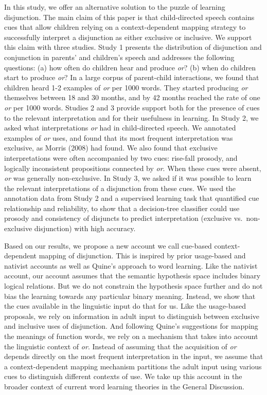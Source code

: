 \documentclass[
  ,man,floatsintext]{apa6}
\begin{document}
In this study, we offer an alternative solution to the puzzle of learning disjunction. The main claim of this paper is that child-directed speech contains cues that allow children relying on a context-dependent mapping strategy to successfully interpret a disjunction as either exclusive or inclusive. We support this claim with three studies. Study 1 presents the distribution of disjunction and conjunction in parents' and children's speech and addresses the following questions: (a) how often do children hear and produce \emph{or}? (b) when do children start to produce \emph{or}? In a large corpus of parent-child interactions, we found that children heard 1-2 examples of \emph{or} per 1000 words. They started producing \emph{or} themselves between 18 and 30 months, and by 42 months reached the rate of one \emph{or} per 1000 words. Studies 2 and 3 provide support both for the presence of cues to the relevant interpretation and for their usefulness in learning. In Study 2, we asked what interpretations \emph{or} had in child-directed speech. We annotated examples of \emph{or} uses, and found that its most frequent interpretation was exclusive, as Morris (2008) had found. We also found that exclusive interpretations were often accompanied by two cues: rise-fall prosody, and logically inconsistent propositions connected by \emph{or}. When these cues were absent, \emph{or} was generally non-exclusive. In Study 3, we asked if it was possible to learn the relevant interpretations of a disjunction from these cues. We used the annotation data from Study 2 and a supervised learning task that quantified cue relationship and reliability, to show that a decision-tree classifier could use prosody and consistency of disjuncts to predict interpretation (exclusive vs.~non-exclusive disjunction) with high accuracy.

Based on our results, we propose a new account we call cue-based context-dependent mapping of disjunction. This is inspired by prior usage-based and nativist accounts as well as Quine's approach to word learning. Like the nativist account, our account assumes that the semantic hypothesis space includes binary logical relations. But we do not constrain the hypothesis space further and do not bias the learning towards any particular binary meaning. Instead, we show that the cues available in the linguistic input do that for us. Like the usage-based proposals, we rely on information in adult input to distinguish between exclusive and inclusive uses of disjunction. And following Quine's suggestions for mapping the meanings of function words, we rely on a mechanism that takes into account the linguistic context of \emph{or}. Instead of assuming that the acquisition of \emph{or} depends directly on the most frequent interpretation in the input, we assume that a context-dependent mapping mechanism partitions the adult input using various cues to distinguish different contexts of use. We take up this account in the broader context of current word learning theories in the General Discussion.
\end{document}
